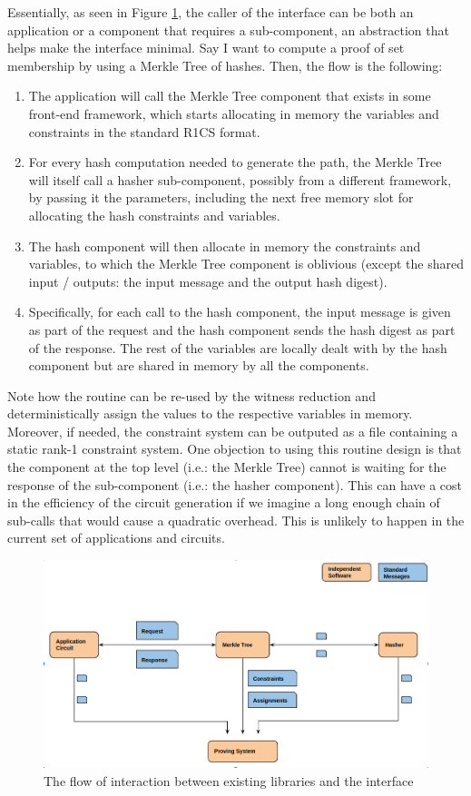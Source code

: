 Essentially, as seen in Figure \ref{flow}, the caller of the interface can be both an application or a component that requires a sub-component, an abstraction that helps make the interface minimal. Say I want to compute a proof of set membership by using a Merkle Tree of hashes. Then, the flow is the following:
\begin{enumerate} 
	\item The application will call the Merkle Tree component that exists in some front-end framework, which starts allocating in memory the variables and constraints in the standard R1CS format.
	\item For every hash computation needed to generate the path, the Merkle Tree will itself call a hasher sub-component, possibly from a different framework, by passing it the parameters, including the next free memory slot for allocating the hash constraints and variables.
	\item The hash component will then allocate in memory the constraints and variables, to which the Merkle Tree component is oblivious (except the shared input / outputs: the input message and the output hash digest).
	\item Specifically, for each call to the hash component, the input message is given as part of the request and the hash component sends the hash digest as part of the response. The rest of the variables are locally dealt with by the hash component but are shared in memory by all the components.
\end{enumerate}

Note how the routine can be re-used by the witness reduction and deterministically assign the values to the respective variables in memory. Moreover, if needed, the constraint system can be outputed as a file containing a static rank-1 constraint system. One objection to using this routine design is that the component at the top level (i.e.: the Merkle Tree) cannot is waiting for the response of the sub-component (i.e.: the hasher component). This can have a cost in the efficiency of the circuit generation if we imagine a long enough chain of sub-calls that would cause a quadratic overhead. This is unlikely to happen in the current set of applications and circuits. 
	
\begin{figure}[h!]
	\includegraphics[width=\linewidth]{routine.png}
	\caption{The flow of interaction between existing libraries and the interface}
	\label{flow}
\end{figure}

